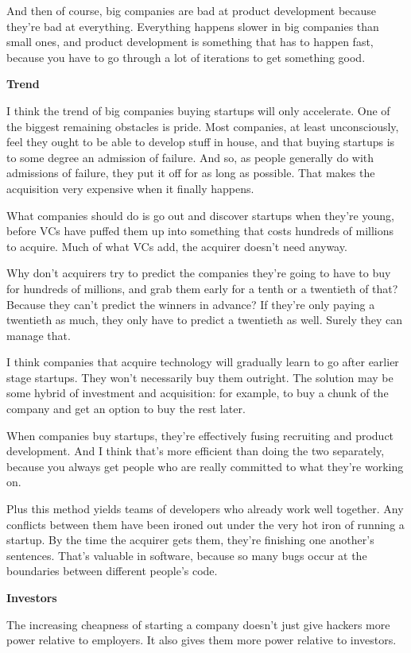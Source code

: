 \documentclass[12pt]{book}
\begin{document}
And then of course, big companies are bad at product development because
they're bad at everything. Everything happens slower in big companies
than small ones, and product development is something that has to happen
fast, because you have to go through a lot of iterations to get
something good.

\textbf{Trend}

I think the trend of big companies buying startups will only accelerate.
One of the biggest remaining obstacles is pride. Most companies, at
least unconsciously, feel they ought to be able to develop stuff in
house, and that buying startups is to some degree an admission of
failure. And so, as people generally do with admissions of failure, they
put it off for as long as possible. That makes the acquisition very
expensive when it finally happens.

What companies should do is go out and discover startups when they're
young, before VCs have puffed them up into something that costs hundreds
of millions to acquire. Much of what VCs add, the acquirer doesn't need
anyway.

Why don't acquirers try to predict the companies they're going to have
to buy for hundreds of millions, and grab them early for a tenth or a
twentieth of that? Because they can't predict the winners in advance? If
they're only paying a twentieth as much, they only have to predict a
twentieth as well. Surely they can manage that.

I think companies that acquire technology will gradually learn to go
after earlier stage startups. They won't necessarily buy them outright.
The solution may be some hybrid of investment and acquisition: for
example, to buy a chunk of the company and get an option to buy the rest
later.

When companies buy startups, they're effectively fusing recruiting and
product development. And I think that's more efficient than doing the
two separately, because you always get people who are really committed
to what they're working on.

Plus this method yields teams of developers who already work well
together. Any conflicts between them have been ironed out under the very
hot iron of running a startup. By the time the acquirer gets them,
they're finishing one another's sentences. That's valuable in software,
because so many bugs occur at the boundaries between different people's
code.

\textbf{Investors}

The increasing cheapness of starting a company doesn't just give hackers
more power relative to employers. It also gives them more power relative
to investors.
\end{document}
